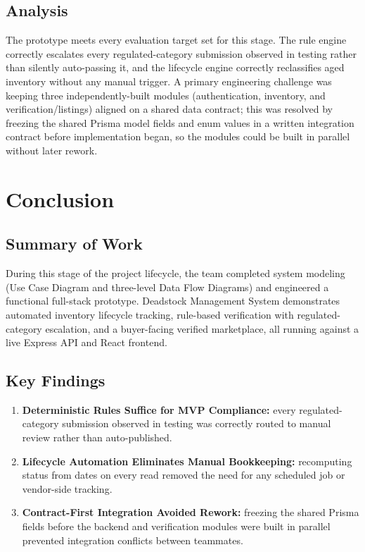 \documentclass[11pt,a4paper]{report}
\begin{document}
\section{Analysis}
The prototype meets every evaluation target set for this stage. The rule
engine correctly escalates every regulated-category submission observed in
testing rather than silently auto-passing it, and the lifecycle engine
correctly reclassifies aged inventory without any manual trigger. A primary
engineering challenge was keeping three independently-built modules
(authentication, inventory, and verification/listings) aligned on a shared
data contract; this was resolved by freezing the shared Prisma model fields
and enum values in a written integration contract before implementation
began, so the modules could be built in parallel without later rework.

\chapter{Conclusion}

\section{Summary of Work}
During this stage of the project lifecycle, the team completed system
modeling (Use Case Diagram and three-level Data Flow Diagrams) and
engineered a functional full-stack prototype. Deadstock Management System
demonstrates automated inventory lifecycle tracking, rule-based
verification with regulated-category escalation, and a buyer-facing
verified marketplace, all running against a live Express API and React
frontend.

\section{Key Findings}
\begin{enumerate}[leftmargin=0.8cm]
    \item \textbf{Deterministic Rules Suffice for MVP Compliance:} every regulated-category submission observed in testing was correctly routed to manual review rather than auto-published.
    \item \textbf{Lifecycle Automation Eliminates Manual Bookkeeping:} recomputing status from dates on every read removed the need for any scheduled job or vendor-side tracking.
    \item \textbf{Contract-First Integration Avoided Rework:} freezing the shared Prisma fields before the backend and verification modules were built in parallel prevented integration conflicts between teammates.
\end{enumerate}
\end{document}
